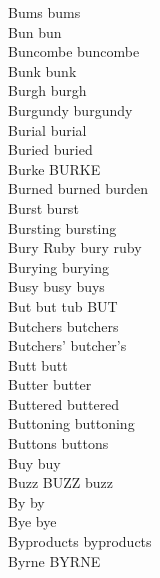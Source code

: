 Bums bums\\
Bun bun\\
Buncombe buncombe\\
Bunk bunk\\
Burgh burgh\\
Burgundy burgundy\\
Burial burial\\
Buried buried\\
Burke BURKE\\
Burned burned burden\\
Burst burst\\
Bursting bursting\\
Bury Ruby bury ruby\\
Burying burying\\
Busy busy buys\\
But but tub BUT\\
Butchers butchers\\
Butchers' butcher's\\
Butt butt\\
Butter butter\\
Buttered buttered\\
Buttoning buttoning\\
Buttons buttons\\
Buy buy\\
Buzz BUZZ buzz\\
By by\\
Bye bye\\
Byproducts byproducts\\
Byrne BYRNE\\

